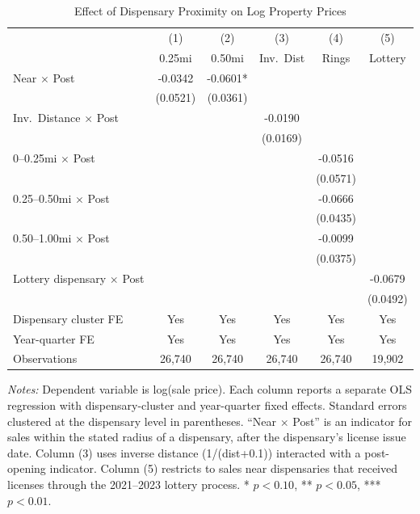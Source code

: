 \begin{table}[H]
\centering
\caption{Effect of Dispensary Proximity on Log Property Prices}
\label{tab:main}
\begin{threeparttable}
\begin{tabular}{lccccc}
\toprule
 & (1) & (2) & (3) & (4) & (5) \\
 & 0.25mi & 0.50mi & Inv.~Dist & Rings & Lottery \\
\midrule
Near $\times$ Post & -0.0342 & -0.0601* & & & \\
 & (0.0521) & (0.0361) & & & \\[4pt]
Inv.~Distance $\times$ Post & & & -0.0190 & & \\
 & & & (0.0169) & & \\[4pt]
0--0.25mi $\times$ Post & & & & -0.0516 & \\
 & & & & (0.0571) & \\[4pt]
0.25--0.50mi $\times$ Post & & & & -0.0666 & \\
 & & & & (0.0435) & \\[4pt]
0.50--1.00mi $\times$ Post & & & & -0.0099 & \\
 & & & & (0.0375) & \\[4pt]
Lottery dispensary $\times$ Post & & & & & -0.0679 \\
 & & & & & (0.0492) \\[4pt]
\midrule
Dispensary cluster FE & Yes & Yes & Yes & Yes & Yes \\
Year-quarter FE & Yes & Yes & Yes & Yes & Yes \\
Observations & 26,740 & 26,740 & 26,740 & 26,740 & 19,902 \\
\bottomrule
\end{tabular}
\begin{tablenotes}[flushleft]
\small
\textit{Notes:} Dependent variable is log(sale price). Each column reports a separate OLS regression with dispensary-cluster and year-quarter fixed effects. Standard errors clustered at the dispensary level in parentheses. ``Near $\times$ Post'' is an indicator for sales within the stated radius of a dispensary, after the dispensary's license issue date. Column (3) uses inverse distance (1/(dist+0.1)) interacted with a post-opening indicator. Column (5) restricts to sales near dispensaries that received licenses through the 2021--2023 lottery process. * $p<0.10$, ** $p<0.05$, *** $p<0.01$.
\end{tablenotes}
\end{threeparttable}
\end{table}

